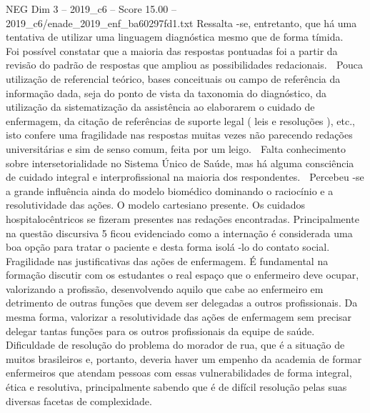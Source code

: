 \begin{textsample}{NEG Dim 3 – 2019\_c6 – Score 15.00 – 2019\_c6/enade\_2019\_enf\_ba60297fd1.txt}
Ressalta -se, entretanto, que há uma tentativa de utilizar uma linguagem diagnóstica mesmo que de forma tímida.  Foi possível constatar que a maioria das respostas pontuadas foi a partir da revisão do padrão de respostas que ampliou as possibilidades redacionais.  Pouca utilização de referencial teórico, bases conceituais ou campo de referência da informação dada, seja do ponto de vista da taxonomia do diagnóstico, da utilização da sistematização da assistência ao elaborarem o cuidado de enfermagem, da citação de referências de suporte legal ( leis e resoluções ), etc., isto confere uma fragilidade nas respostas muitas vezes não parecendo redações universitárias e sim de senso comum, feita por um leigo.  Falta conhecimento sobre intersetorialidade no Sistema Único de Saúde, mas há alguma consciência de cuidado integral e interprofissional na maioria dos respondentes.  Percebeu -se a grande influência ainda do modelo biomédico dominando o raciocínio e a resolutividade das ações.
O modelo cartesiano presente.
Os cuidados hospitalocêntricos se fizeram presentes nas redações encontradas.
Principalmente na questão discursiva 5 ficou evidenciado como a internação é considerada uma boa opção para tratar o paciente e desta forma isolá -lo do contato social.  Fragilidade nas justificativas das ações de enfermagem.
É fundamental na formação discutir com os estudantes o real espaço que o enfermeiro deve ocupar, valorizando a profissão, desenvolvendo aquilo que cabe ao enfermeiro em detrimento de outras funções que devem ser delegadas a outros profissionais.
Da mesma forma, valorizar a resolutividade das ações de enfermagem sem precisar delegar tantas funções para os outros profissionais da equipe de saúde.
Dificuldade de resolução do problema do morador de rua, que é a situação de muitos brasileiros e, portanto, deveria haver um empenho da academia de formar enfermeiros que atendam pessoas com essas vulnerabilidades de forma integral, ética e resolutiva, principalmente sabendo que é de difícil resolução pelas suas diversas facetas de complexidade.

\end{textsample}
